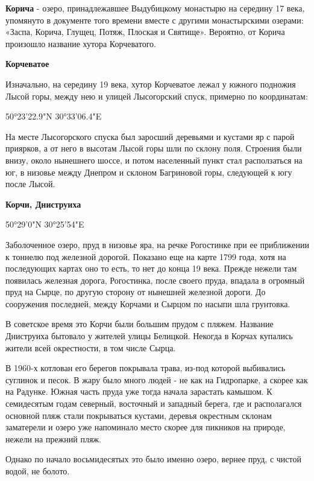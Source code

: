 \textbf{Корича} - озеро, принадлежавшее Выдубицкому монастырю на середину 17 века, упомянуто в документе того времени вместе с другими монастырскими озерами: «Заспа, Корича, Глущец, Потяж, Плоская и Святище». Вероятно, от Корича произошло название хутора Корчеватого.\\

\medskip


\textbf{Корчеватое} 

Изначально, на середину 19 века, хутор Корчеватое лежал у южного подножия Лысой горы, между нею и улицей Лысогорский спуск, примерно по координатам:

50°23'22.9"N 30°33'06.4"E

На месте Лысогорского спуска был заросший деревьями и кустами яр с парой приярков, а от него в высотам Лысой горы шли по склону поля. Строения были внизу, около нынешнего 
шоссе, и потом населенный пункт стал расползаться на юг, в низовье между Днепром и склоном Багриновой горы, следующей к югу после Лысой.\\

\medskip

\textbf{Корчи, Дниструиха}

50°29'0"N 30°25'54"E

Заболоченное озеро, пруд в низовье яра, на речке Рогостинке при ее приближении к тоннелю под железной дорогой. Показано еще на карте 1799 года, хотя на последующих картах оно то есть, то нет до конца 19 века. Прежде нежели там появилась железная дорога, Рогостинка, после своего пруда, впадала в огромный пруд на Сырце, по другую сторону от нынешней железной дороги. До сооружения последней, между Корчами и Сырцом по насыпи шла грунтовка.

В советское время это Корчи были большим прудом с пляжем. Название Дниструиха бытовало у жителей улицы Белицкой. Некогда в Корчах купались жители всей окрестности, в том числе Сырца.

В 1960-х котлован его берегов покрывала трава, из-под которой выбивались суглинок и песок. В жару было много людей - не как на Гидропарке, а скорее как на Радунке. Южная часть пруда уже тогда начала зарастать камышом. К семидесятым годам северный, восточный и западный берега, где и располагался основной пляж стали покрываться кустами, деревья окрестным склонам заматерели и озеро уже напоминало место скорее для пикников на природе, нежели на прежний пляж.

Однако по начало восьмидесятых это было именно озеро, вернее пруд, с чистой водой, не болото.

